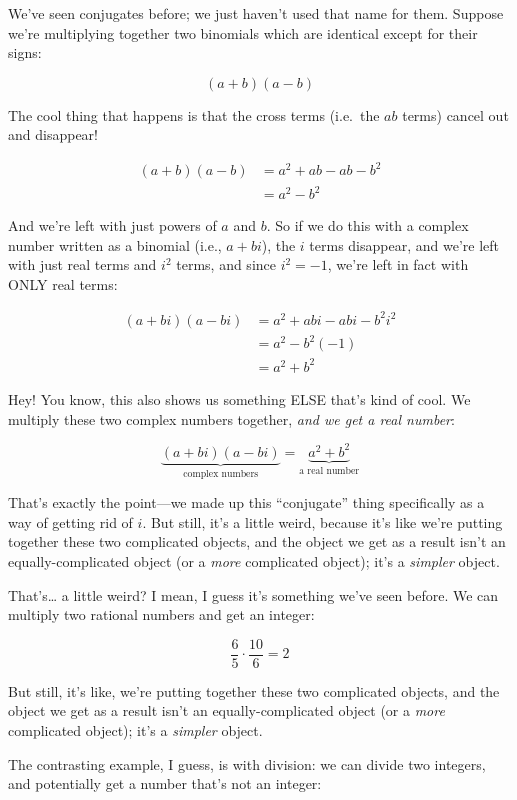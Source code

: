 \documentclass[
]{article}
\begin{document}
We've seen conjugates before; we just haven't used that name for them.
Suppose we're multiplying together two binomials which are identical
except for their signs:

\[(a+b)(a-b)\]

The cool thing that happens is that the cross terms (i.e.~the \(ab\)
terms) cancel out and disappear!

\[
\begin{align*}
(a+b)(a-b) &= a^2 + ab - ab -b^2 \\
&= a^2 - b^2
\end{align*}
\]

And we're left with just powers of \(a\) and \(b\). So if we do this
with a complex number written as a binomial (i.e., \(a+bi\)), the \(i\)
terms disappear, and we're left with just real terms and \(i^2\) terms,
and since \(i^2=-1\), we're left in fact with ONLY real terms:

\[
\begin{align*}
(a+bi)(a-bi) &= a^2 +abi - abi -b^2i^2 \\
&= a^2 -b^2(-1) \\
&= a^2+b^2
\end{align*}
\]

Hey! You know, this also shows us something ELSE that's kind of cool. We
multiply these two complex numbers together, \emph{and we get a real
number}:

\[\underbrace{(a+bi)(a-bi)}_{\text{complex numbers}} = \underbrace{a^2+b^2}_{\text{a real number}}\]

That's exactly the point---we made up this ``conjugate'' thing
specifically as a way of getting rid of \(i\). But still, it's a little
weird, because it's like we're putting together these two complicated
objects, and the object we get as a result isn't an equally-complicated
object (or a \emph{more} complicated object); it's a \emph{simpler}
object.

That's\ldots{} a little weird? I mean, I guess it's something we've seen
before. We can multiply two rational numbers and get an integer:

\[\frac{6}{5}\cdot\frac{10}{6} = 2\]

But still, it's like, we're putting together these two complicated
objects, and the object we get as a result isn't an equally-complicated
object (or a \emph{more} complicated object); it's a \emph{simpler}
object.

The contrasting example, I guess, is with division: we can divide two
integers, and potentially get a number that's not an integer:
\end{document}
